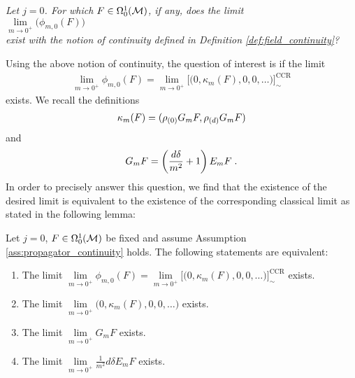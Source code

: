 \begin{center}\textit{
		Let $j=0$. For which $F \in \Omega^1_0(\mathcal{M})$, if any, does the limit\\[2mm] $\lim\limits_{m\to 0^+} \big( \phi_{m,0}(F) \big)$\\[2mm] exist with the notion of continuity defined in Definition \ref{def:field_continuity}?}
\end{center}
Using the above notion of continuity, the question of interest is if the limit
\begin{align}
	\lim\limits_{m \to 0^+} \phi_{m,0}(F) = \lim\limits_{m \to 0^+} \big[\big( 0 , \kappa_m(F) , 0 , 0, \dots\big)\big]^\text{CCR}_\sim
	\end{align}
exists. We recall the definitions
\begin{align}
\kappa_m(F) = (\rho_{(0)} G_m F, \rho_{(d)} G_m F)
\end{align} and
\begin{align}
	G_m F = \left( \frac{d \delta}{m^2} + 1\right) E_m F \;.
\end{align}
In order to precisely answer this question, we find that the existence of the desired limit is equivalent to the existence of the corresponding classical limit as stated in the following lemma:
\begin{lemma}\label{lem:limit_existence_quantum_equivalence}
	Let $j=0$, $F \in \Omega^1_0(\mathcal{M})$ be fixed and assume Assumption \ref{ass:propagator_continuity} holds. The following statements are equivalent:
	\begin{enumerate}
		\item {The limit $\lim\limits_{m \to 0^+} \phi_{m,0}(F) = \lim\limits_{m \to 0^+} \big[\big( 0 , \kappa_m(F) , 0 , 0, \dots\big)\big]^\text{CCR}_\sim $ exists. \\}
        \item {The limit $\lim\limits_{m \to 0^+} \big( 0 , \kappa_m(F) , 0 , 0, \dots\big)$ exists. \\}
		\item {The limit $\lim\limits_{m \to 0^+} G_m F $ exists.  \\}
		\item {The limit $\lim\limits_{m \to 0^+} \frac{1}{m^2}d \delta E_m F $ exists. }
	\end{enumerate}
\end{lemma}

